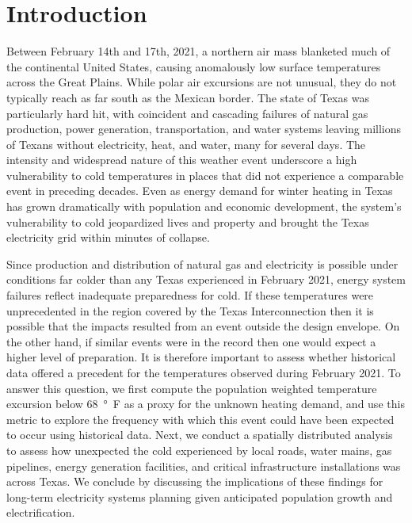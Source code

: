 \documentclass[12pt]{iopart}
\begin{document}
\submitto{\ERL}
\maketitle

\section{Introduction}

Between February 14th and 17th, 2021, a northern air mass blanketed much of the continental United States, causing anomalously low surface temperatures across the Great Plains.
While polar air excursions are not unusual, they do not typically reach as far south as the Mexican border.
The state of Texas was particularly hard hit, with coincident and cascading failures of natural gas production, power generation, transportation, and water systems leaving millions of Texans without electricity, heat, and water, many for several days.
The intensity and widespread nature of this weather event underscore a high vulnerability to cold temperatures in places that did not experience a comparable event in preceding decades.
Even as energy demand for winter heating in Texas has grown dramatically with population and economic development, the system’s vulnerability to cold jeopardized lives and property and brought the Texas electricity grid within minutes of collapse.

Since production and distribution of natural gas and electricity is possible under conditions far colder than any Texas experienced in February 2021, energy system failures reflect inadequate preparedness for cold.
If these temperatures were unprecedented in the region covered by the Texas Interconnection then it is possible that the impacts resulted from an event outside the design envelope.
On the other hand, if similar events were in the record then one would expect a higher level of preparation.
It is therefore important to assess whether historical data offered a precedent for the temperatures observed during February 2021.
To answer this question, we first compute the population weighted temperature excursion below \SI{68}{\degree F} as a proxy for the unknown heating demand, and use this metric to explore the frequency with which this event could have been expected to occur using historical data.
Next, we conduct a spatially distributed analysis to assess how unexpected the cold experienced by local roads, water mains, gas pipelines, energy generation facilities, and critical infrastructure installations was across Texas.
We conclude by discussing the implications of these findings for long-term electricity systems planning given anticipated population growth and electrification.
\end{document}
